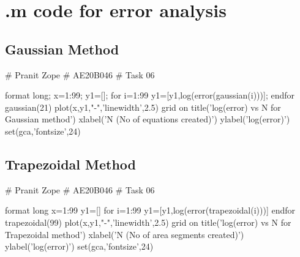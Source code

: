 \documentclass[12pt]{article}
\begin{document}
\section{.m code for error analysis}
\subsection{Gaussian Method}
\begin{python}
# Pranit Zope
# AE20B046
# Task 06


format long;
x=1:99;
y1=[];
for i=1:99
  y1=[y1,log(error(gaussian(i)))];
endfor
gaussian(21)
plot(x,y1,"-",'linewidth',2.5)
grid on
title('log(error) vs N for Gaussian method')
xlabel('N (No of equations created)')
ylabel('log(error)')
set(gca,'fontsize',24)

\end{python}

\subsection{Trapezoidal Method}
\begin{python}

# Pranit Zope
# AE20B046
# Task 06

format long
x=1:99
y1=[]
for i=1:99
  y1=[y1,log(error(trapezoidal(i)))]
endfor
trapezoidal(99)
plot(x,y1,"-",'linewidth',2.5)
grid on
title('log(error) vs N for Trapezoidal method')
xlabel('N (No of area segments created)')
ylabel('log(error)')
set(gca,'fontsize',24)

\end{python}
\end{document}

